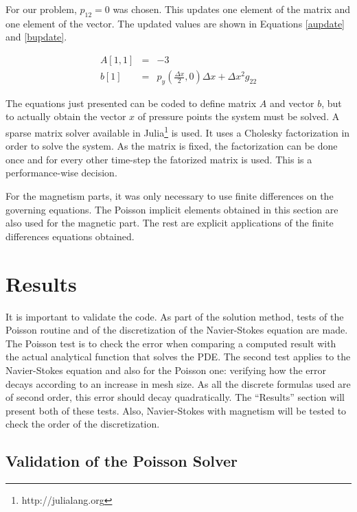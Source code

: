 \documentclass[journal]{IEEEtran}
\begin{document}
For our problem, $p_{12} = 0$ was chosen. This updates one element of the matrix and one element of the vector. The updated values are shown in Equations \ref{aupdate} and \ref{bupdate}.

\begin{eqnarray}
A[1,1] &=& -3 \label{aupdate} \\
b[1] & = & p_y\left(\frac{\Delta x}{2},0\right)\Delta x + \Delta x^2 g_{22} \label{bupdate}
\end{eqnarray}

The equations just presented can be coded to define matrix $A$ and vector $b$, but to actually obtain the vector $x$ of pressure points the system must be solved. A sparse matrix solver available in Julia\footnote{http://julialang.org} is used. It uses a Cholesky factorization in order to solve the system. As the matrix is fixed, the factorization can be done once and for every other time-step the fatorized matrix is used. This is a performance-wise decision.

For the magnetism parts, it was only necessary to use finite differences on the governing equations. The Poisson implicit elements obtained in this section are also used for the magnetic part. The rest are explicit applications of the finite differences equations obtained.



\section{Results}

It is important to validate the code. As part of the solution method, tests of the Poisson routine and of the discretization of the Navier-Stokes equation are made. The Poisson test is to check the error when comparing a computed result with the actual analytical function that solves the PDE. The second test applies to the Navier-Stokes equation and also for the Poisson one: verifying how the error decays according to an increase in mesh size. As all the discrete formulas used are of second order, this error should decay quadratically. The ``Results'' section will present both of these tests. Also, Navier-Stokes with magnetism will be tested to check the order of the discretization.


\subsection{Validation of the Poisson Solver}
\end{document}
